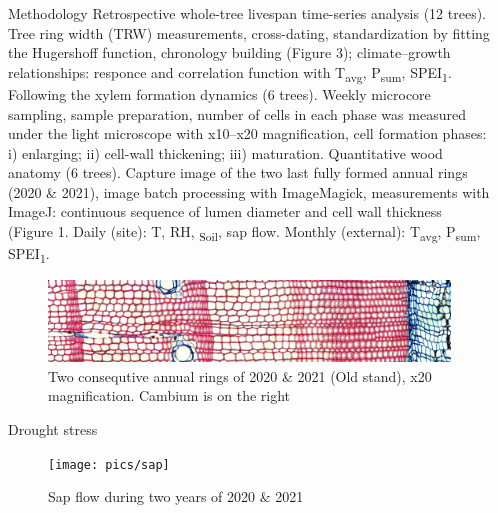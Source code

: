 \documentclass[final]{beamer}
\newlength{\sepwidth}
\newlength{\colwidth}
\newcommand{\separatorcolumn}{\begin{column}{\sepwidth}\end{column}}
\begin{document}
\begin{frame}[t]
\begin{columns}[t]
\begin{column}{\colwidth}
    \begin{block}{Methodology}
            Retrospective whole-tree livespan time-series analysis (12 trees). Tree ring width (TRW) measurements, cross-dating, standardization by fitting the Hugershoff function, chronology building (Figure 3); climate--growth relationships: responce and correlation function with T\textsubscript{avg}, P\textsubscript{sum}, SPEI\textsubscript{1}.
            Following the xylem formation dynamics (6 trees). Weekly microcore sampling, sample preparation, number of cells in each phase was measured under the light microscope with x10--x20 magnification, cell formation phases: i) enlarging; ii) cell-wall thickening; iii) maturation.
            Quantitative wood anatomy (6 trees). Capture image of the two last fully formed annual rings (2020 \& 2021), image batch processing with ImageMagick, measurements with ImageJ: continuous sequence of lumen diameter and cell wall thickness (Figure 1.
            Daily (site): T, RH, \Psi\textsubscript{Soil}, sap flow. Monthly (external): T\textsubscript{avg}, P\textsubscript{sum}, SPEI\textsubscript{1}.
            \begin{figure}
                \centering \includegraphics[width=1\textwidth]{pics/sob}
                \caption{Two consequtive annual rings of 2020 \& 2021 (Old stand), x20 magnification. Cambium is on the right \rightarrow}
            \end{figure}
    \end{block}

    \begin{block}{Drought stress}
            \begin{figure}
                \centering \texttt{[image: pics/sap]}
                \caption{Sap flow during two years of 2020 \& 2021}
            \end{figure}
    \end{block}

\end{column}


\begin{column}{\colwidth}


\end{column}
\end{columns}
\end{frame}
\end{document}
